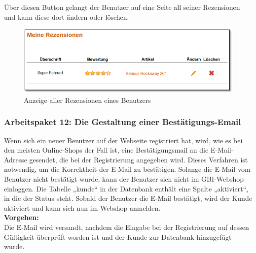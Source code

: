 Über diesen Button gelangt der Benutzer auf eine Seite all seiner Rezensionen und kann diese dort ändern oder löschen.

\begin{figure}[H]
\begin{center}
\includegraphics[width=12cm]{Bilder/Michael_Abbildung14-AnzeigeAllerRezensionenEinesBenutzers.png}
\end{center}
\caption{Anzeige aller Rezensionen eines Benutzers}
\end{figure}

\newpage

\subsubsection{Arbeitspaket 12: Die Gestaltung einer Bestätigungs-Email}

Wenn sich ein neuer Benutzer auf der Webseite registriert hat, wird, wie es bei den meisten Online-Shops der Fall ist, eine Bestätigungsmail an die E-Mail-Adresse gesendet, die bei der Registrierung angegeben wird. Dieses Verfahren ist notwendig, um die Korrektheit der E-Mail zu bestätigen. 
Solange die E-Mail vom Benutzer nicht bestätigt wurde, kann der Benutzer sich nicht im GBI-Webshop einloggen. Die Tabelle „kunde“ in der Datenbank enthält eine Spalte „aktiviert“, in die der Status steht. Sobald der Benutzer die E-Mail bestätigt, wird der Kunde aktiviert und kann sich nun im Webshop anmelden.\\

\textbf{Vorgehen:}\\
Die E-Mail wird versandt, nachdem die Eingabe bei der Registrierung auf dessen Gültigkeit überprüft worden ist und der Kunde zur Datenbank hinzugefügt wurde. 


